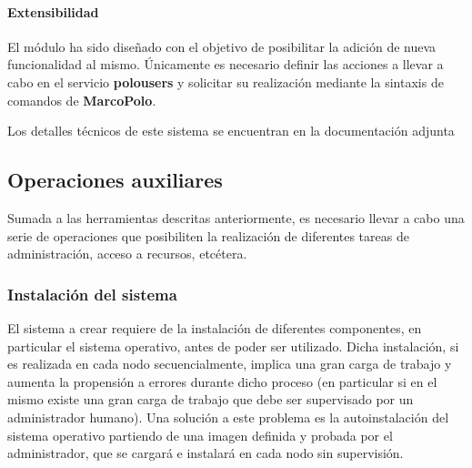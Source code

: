 \paragraph{Extensibilidad\\}

El módulo ha sido diseñado con el objetivo de posibilitar la adición de nueva funcionalidad al mismo. Únicamente es necesario definir las acciones a llevar a cabo en el servicio \textbf{polousers} y solicitar su realización mediante la sintaxis de comandos de \textbf{MarcoPolo}.

\vspace{2cm}

Los detalles técnicos de este sistema se encuentran en la documentación adjunta \citationneeded[TODO]

\subsection{Operaciones auxiliares}

Sumada a las herramientas descritas anteriormente, es necesario llevar a cabo una serie de operaciones que posibiliten la realización de diferentes tareas de administración, acceso a recursos, etcétera.%


\subsubsection{Instalación del sistema}

El sistema a crear requiere de la instalación de diferentes componentes, en particular el sistema operativo, antes de poder ser utilizado. Dicha instalación, si es realizada en cada nodo secuencialmente, implica una gran carga de trabajo y aumenta la propensión a errores durante dicho proceso (en particular si en el mismo existe una gran carga de trabajo que debe ser supervisado por un administrador humano). Una solución a este problema es la autoinstalación del sistema operativo partiendo de una imagen definida y probada por el administrador, que se cargará e instalará en cada nodo sin supervisión.

